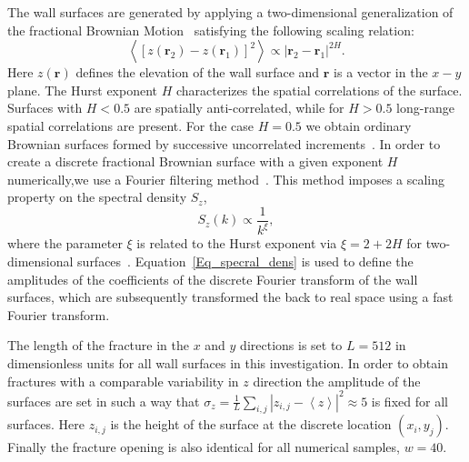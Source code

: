 \documentclass[aps,pre,
superscriptaddress,
twocolumn,
notitlepage,
10pt,]{revtex4-1}
\begin{document}
The wall surfaces are generated by applying a two-dimensional generalization of
the fractional Brownian Motion~\cite{Oliveira2011, Morais2011, Mandelbrot1968,
	Peitgen2011} satisfying the following scaling relation:
%
\begin{equation}
\left<\left[z\left(\mathbf{r}_2\right) -
z\left(\mathbf{r}_1\right)\right]^2 \right>
\propto \left|\mathbf{r}_2 - \mathbf{r}_1\right|^{2H}.
\end{equation}
%
Here $z(\mathbf{r})$ defines the elevation of the wall surface and
$\mathbf{r}$ is a vector in the $x-y$ plane. The Hurst exponent $H$
characterizes the spatial correlations of the surface. Surfaces with
$H<0.5$ are spatially anti-correlated, while for $H>0.5$ long-range spatial
correlations are present. For the case $H=0.5$ we obtain ordinary Brownian
surfaces formed by successive uncorrelated increments~\cite{Peitgen2011}.
%
In order to create a discrete fractional Brownian surface with a given exponent
$H$ numerically,we use a Fourier filtering method~\cite{Earnshaw1991,
	Peitgen2011}. This method imposes a scaling property on the spectral density
$S_z$,
%
\begin{equation}\label{Eq_specral_dens}
S_z(k) \propto \frac{1}{k^\xi},
\end{equation}
%
where the parameter $\xi$ is related to the Hurst exponent via $\xi=2+2H$ for
two-dimensional surfaces~\cite{Hansen2001}. Equation~\ref{Eq_specral_dens} is
used to define the amplitudes of the coefficients of the discrete Fourier
transform of the wall surfaces, which are subsequently transformed the back to
real space using a fast Fourier transform.

The length of the fracture in the $x$ and $y$  directions is set to $L=512$
in dimensionless units for all wall surfaces in this investigation. In
order to obtain fractures with a comparable variability in $z$ direction
the amplitude of the surfaces are set in such a way that
%
$\sigma_z=\frac{1}{L}\sum_{i,j}\left|z_{i,j}-\left<z\right>\right|^2\approx 5$
%
is fixed for all surfaces. Here $z_{i,j}$ is the height of the surface at
the discrete location $\left(x_i,y_j\right)$. Finally the fracture opening
is also identical for all numerical samples, $w=40$.
\end{document}
